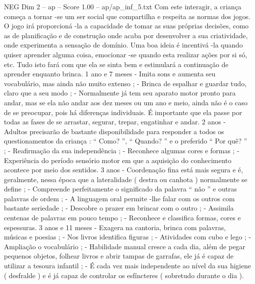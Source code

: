 \begin{textsample}{NEG Dim 2 – ap – Score 1.00 – ap/ap\_inf\_5.txt}
Com este interagir, a criança começa a tornar -se um ser social que compartilha e respeita as normas dos jogos.
O jogo irá proporcioná -la a capacidade de tomar as suas próprias decisões, como as de planificação e de construção onde acaba por desenvolver a sua criatividade, onde experimenta a sensação de domínio.
Uma boa ideia é incentivá -la quando quiser aprender alguma coisa, emocionar -se quando esta realizar ações por si só, etc.
Tudo isto fará com que ela se sinta bem e estimulará a continuação de aprender enquanto brinca. 1 ano e 7 meses - Imita sons e aumenta seu vocabulário, mas ainda não muito extenso ; - Brinca de espalhar e guardar tudo, claro que a seu modo ; - Normalmente já tem seu aparato motor pronto para andar, mas se ela não andar aos dez meses ou um ano e meio, ainda não é o caso de se preocupar, pois há diferenças individuais.
É importante que ela passe por todas as fases de se arrastar, segurar, trepar, engatinhar e andar. 2 anos - Adultos precisarão de bastante disponibilidade para responder a todos os questionamentos da criança : “ Como? ”, “ Quando? ” e o preferido “ Por quê? ” ; - Reafirmação da sua independência ; - Reconhece algumas cores e formas ; - Experiência do período sensório motor em que a aquisição do conhecimento acontece por meio dos sentidos. 3 anos - Coordenação fina está mais segura e é, geralmente, nessa época que a lateralidade ( destra ou canhota ) normalmente se define ; - Compreende perfeitamente o significado da palavra “ não ” e outras palavras de ordem ; - A linguagem oral permite -lhe falar com os outros com bastante seriedade ; - Descobre o prazer em brincar com o outro ; - Assimila centenas de palavras em pouco tempo ; - Reconhece e classifica formas, cores e espessuras. 3 anos e 11 meses - Exagera na cantoria, brinca com palavras, músicas e poesias ; - Nos livros identifica figuras ; - Atividades com cubo e lego ; - Ampliação o vocabulário ; - Habilidade manual cresce a cada dia, além de pegar pequenos objetos, folhear livros e abrir tampas de garrafas, ele já é capaz de utilizar a tesoura infantil ; - É cada vez mais independente ao nível da sua higiene ( desfralde ) e é já capaz de controlar os esfíncteres ( sobretudo durante o dia ).

\end{textsample}

